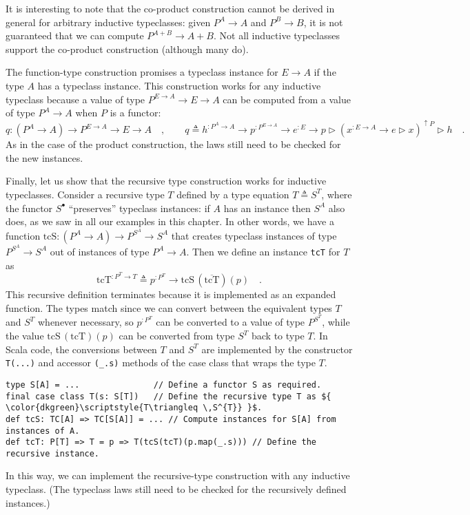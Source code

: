 It is interesting to note that the co-product construction cannot
be derived in general for arbitrary inductive typeclasses: given $P^{A}\rightarrow A$
and $P^{B}\rightarrow B$, it is not guaranteed that we can compute
$P^{A+B}\rightarrow A+B$. Not all inductive typeclasses support the
co-product construction (although many do).

The function-type construction promises a typeclass instance for $E\rightarrow A$
if the type $A$ has a typeclass instance. This construction works
for any inductive typeclass because a value of type $P^{E\rightarrow A}\rightarrow E\rightarrow A$
can be computed from a value of type $P^{A}\rightarrow A$ when $P$
is a functor:
\[
q:(P^{A}\rightarrow A)\rightarrow P^{E\rightarrow A}\rightarrow E\rightarrow A\quad,\quad\quad q\triangleq h^{:P^{A}\rightarrow A}\rightarrow p^{:P^{E\rightarrow A}}\rightarrow e^{:E}\rightarrow p\triangleright(x^{:E\rightarrow A}\rightarrow e\triangleright x)^{\uparrow P}\triangleright h\quad.
\]
As in the case of the product construction, the laws still need to
be checked for the new instances.

Finally, let us show that the recursive type construction works for
inductive typeclasses. Consider a recursive type $T$ defined by a
type equation $T\triangleq S^{T}$, where the functor $S^{\bullet}$
\textsf{``}preserves\textsf{''} typeclass instances: if $A$ has an instance then
$S^{A}$ also does, as we saw in all our examples in this chapter.
In other words, we have a function $\text{tcS}:(P^{A}\rightarrow A)\rightarrow P^{S^{A}}\rightarrow S^{A}$
that creates typeclass instances of type $P^{S^{A}}\rightarrow S^{A}$
out of instances of type $P^{A}\rightarrow A$. Then we define an
instance \lstinline!tcT! for $T$ as 
\[
\text{tcT}^{:P^{T}\rightarrow T}\triangleq p^{:P^{T}}\rightarrow\text{tcS}\,(\overline{\text{tcT}})(p)\quad.
\]
This recursive definition terminates because it is implemented as
an expanded function. The types match since we can convert between
the equivalent types $T$ and $S^{T}$ whenever necessary, so $p^{:P^{T}}$
can be converted to a value of type $P^{S^{T}}$, while the value
$\text{tcS}\,(\text{tcT})(p)$ can be converted from type $S^{T}$
back to type $T$. In Scala code, the conversions between $T$ and
$S^{T}$ are implemented by the constructor \lstinline!T(...)! and
accessor \lstinline!(_.s)! methods of the case class that wraps the
type $T$.
\begin{lstlisting}[mathescape=true]
type S[A] = ...               // Define a functor S as required.
final case class T(s: S[T])   // Define the recursive type T as ${ \color{dkgreen}\scriptstyle{T\triangleq \,S^{T}} }$.
def tcS: TC[A] => TC[S[A]] = ... // Compute instances for S[A] from instances of A.
def tcT: P[T] => T = p => T(tcS(tcT)(p.map(_.s))) // Define the recursive instance.
\end{lstlisting}
In this way, we can implement the recursive-type construction with
any inductive typeclass. (The typeclass laws still need to be checked
for the recursively defined instances.)

